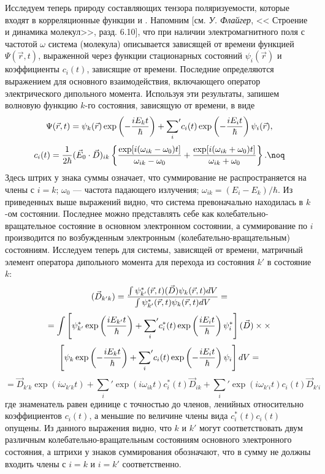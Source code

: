 Исследуем теперь природу составляющих тензора поляризуемости,
которые входят в корреляционные функции  и .
Напомним [см. {\it У. Флайгер}, << Строение и динамика
молекул>>, разд. 6.10],
что при наличии электромагнитного поля с частотой $\omega$
система (молекула) описывается зависящей от времени функцией
$\Psi(\vec r,t)$, выраженной через функции стационарных состояний
$\psi_i(\vec r)$ и коэффициенты $c_i(t)$, зависящие от времени.
Последние определяются выражением для основного взаимодействия,
включающего оператор электрического дипольного момента.
Используя эти результаты, запишем волновую функцию
$k$-го состояния, зависящую от времени, в виде
$$\Psi(\vec r,t)=\psi_k(\vec
r)\exp\left(-{iE_kt\over\hbar}\right)+{\sum\limits_i}'c_i(t)\exp\left(-
{iE_it\over\hbar}\right)\psi_i(\vec r),$$
$$c_i(t)={1\over2\hbar}(\vec E_0\cdot\vec
D)_{ik}\left\{{\exp[i(\omega_{ik}-\omega_0)t]\over
\omega_{ik}-\omega_0}+{\exp[i(\omega_{ik}+\omega_0)t]\over \omega_{ik}+\omega_0}\right\}.\noq$$
Здесь штрих у знака суммы означает, что суммирование не
распространяется на члены с $i=k$; $\omega_0$ --- частота падающего
излучения; $\omega_{ik}=(E_i-E_k)/\hbar$. Из приведенных выше
выражений видно, что система превоначально находилась в $k$-ом
состоянии. Последнее можно представлять себе как
колебательно-вращательное состояние в основном электронном
состоянии, а суммирование по $i$ производится по возбужденным
электронным (колебательно-вращательным) состояниям. Исследуем
теперь для системы, зависящей от времени, матричный элемент
оператора дипольного момента для перехода из состояния $k'$ в
состояние $k$:
$$
(\vec D_{k'k})={\int\psi_{k'}^*(\vec r,t)(\vec D)\psi_k(\vec
r,t)dV\over\int\psi_{k'}^*(\vec r,t)\psi_k(\vec
r,t)dV}=$$ $$
=\int\left[\psi_{k'}^*\exp\left({iE_{k'}t\over\hbar}\right)+{\sum\limits_i}'
c_i^*(t)\exp\left({iE_it\over\hbar}\right)\psi_i^*\right](\vec
D)\times
\times$$ $$
\left[\psi_{k}\exp\left(-{iE_{k}t\over\hbar}\right)+{\sum\limits_i}'
c_i(t)\exp\left(-{iE_it\over\hbar}\right)\psi_i\right]dV=$$ $$
=\vec D_{k'k}\exp(i\omega_{k'k}t)+{\sum\limits_{i}}'\exp(i\omega_{ik}t)c_i^*(t)\vec
D_{ik}+{\sum\limits_{i}}'\exp(i\omega_{k'i}t)c_i(t)\vec
D_{k'i}
$$
где знаменатель равен единице с точностью до членов, ленийных
относительно коэффициентов $c_i(t)$, а меньшие по величине члены
вида $c_i^*(t)c_i(t)$ опущены. Из данного выражения видно, что
$k$ и $k'$ могут соответствовать двум различным
колебательно-вращательным состояниям основного электронного
состояния, а штрихи у знаков суммирования обозначают, что в сумму
не должны входить члены с $i=k$ и $i=k'$ соответственно.
